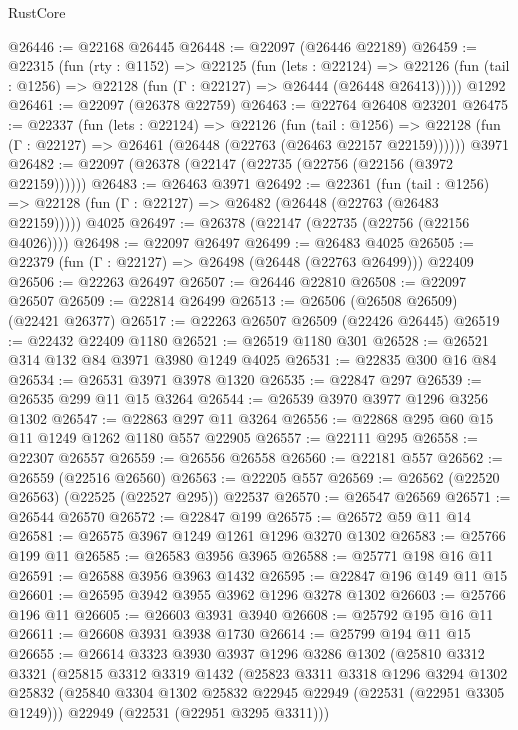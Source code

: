 \begin{lexlean}{RustCore}
\begin{coremodule}
@26446 := @22168 @26445
@26448 := @22097 (@26446 @22189)
@26459 := @22315
    (fun (rty : @1152) =>
    @22125
      (fun (lets : @22124) =>
      @22126 (fun (tail : @1256) => @22128 (fun (Γ : @22127) => @26444 (@26448 @26413)))))
    @1292
@26461 := @22097 (@26378 @22759)
@26463 := @22764 @26408 @23201
@26475 := @22337
    (fun (lets : @22124) =>
    @22126
      (fun (tail : @1256) =>
      @22128 (fun (Γ : @22127) => @26461 (@26448 (@22763 (@26463 @22157 @22159))))))
    @3971
@26482 := @22097 (@26378 (@22147 (@22735 (@22756 (@22156 (@3972 @22159))))))
@26483 := @26463 @3971
@26492 := @22361
    (fun (tail : @1256) => @22128 (fun (Γ : @22127) => @26482 (@26448 (@22763 (@26483 @22159)))))
    @4025
@26497 := @26378 (@22147 (@22735 (@22756 (@22156 @4026))))
@26498 := @22097 @26497
@26499 := @26483 @4025
@26505 := @22379 (fun (Γ : @22127) => @26498 (@26448 (@22763 @26499))) @22409
@26506 := @22263 @26497
@26507 := @26446 @22810
@26508 := @22097 @26507
@26509 := @22814 @26499
@26513 := @26506 (@26508 @26509) (@22421 @26377)
@26517 := @22263 @26507 @26509 (@22426 @26445)
@26519 := @22432 @22409 @1180
@26521 := @26519 @1180 @301
@26528 := @26521 @314 @132 @84 @3971 @3980 @1249 @4025
@26531 := @22835 @300 @16 @84
@26534 := @26531 @3971 @3978 @1320
@26535 := @22847 @297
@26539 := @26535 @299 @11 @15 @3264
@26544 := @26539 @3970 @3977 @1296 @3256 @1302
@26547 := @22863 @297 @11 @3264
@26556 := @22868 @295 @60 @15 @11 @1249 @1262 @1180 @557 @22905
@26557 := @22111 @295
@26558 := @22307 @26557
@26559 := @26556 @26558
@26560 := @22181 @557
@26562 := @26559 (@22516 @26560)
@26563 := @22205 @557
@26569 := @26562 (@22520 @26563) (@22525 (@22527 @295)) @22537
@26570 := @26547 @26569
@26571 := @26544 @26570
@26572 := @22847 @199
@26575 := @26572 @59 @11 @14
@26581 := @26575 @3967 @1249 @1261 @1296 @3270 @1302
@26583 := @25766 @199 @11
@26585 := @26583 @3956 @3965
@26588 := @25771 @198 @16 @11
@26591 := @26588 @3956 @3963 @1432
@26595 := @22847 @196 @149 @11 @15
@26601 := @26595 @3942 @3955 @3962 @1296 @3278 @1302
@26603 := @25766 @196 @11
@26605 := @26603 @3931 @3940
@26608 := @25792 @195 @16 @11
@26611 := @26608 @3931 @3938 @1730
@26614 := @25799 @194 @11 @15
@26655 := @26614
    @3323
    @3930
    @3937
    @1296
    @3286
    @1302
    (@25810
      @3312
      @3321
      (@25815
        @3312
        @3319
        @1432
        (@25823
          @3311
          @3318
          @1296
          @3294
          @1302
          @25832
          (@25840 @3304 @1302 @25832 @22945 @22949 (@22531 (@22951 @3305 @1249)))
          @22949
          (@22531 (@22951 @3295 @3311)))

\end{coremodule}
\end{lexlean}

